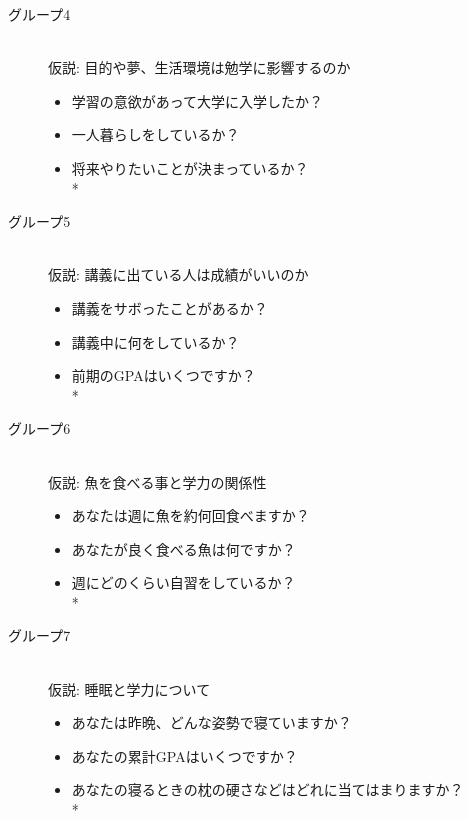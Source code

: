\begin{description}
 \item[グループ4]\mbox{}\\
 仮説: 目的や夢、生活環境は勉学に影響するのか
	    \begin{itemize}
   	\item 学習の意欲があって大学に入学したか？
   	\item 一人暮らしをしているか？
   	\item 将来やりたいことが決まっているか？   \vspace{0.1in} \\*
	\end{itemize}

 \item[グループ5]\mbox{}\\
 仮説: 講義に出ている人は成績がいいのか
	    \begin{itemize}
   	\item 講義をサボったことがあるか？
   	\item 講義中に何をしているか？
   	\item 前期のGPAはいくつですか？   \vspace{0.1in} \\*
	\end{itemize}

 \item[グループ6]\mbox{}\\
 仮説: 魚を食べる事と学力の関係性
	    \begin{itemize}
   	\item あなたは週に魚を約何回食べますか？
   	\item あなたが良く食べる魚は何ですか？
   	\item 週にどのくらい自習をしているか？   \vspace{0.1in} \\*
	\end{itemize}

 \item[グループ7]\mbox{}\\
 仮説: 睡眠と学力について
	    \begin{itemize}
   	\item あなたは昨晩、どんな姿勢で寝ていますか？
   	\item あなたの累計GPAはいくつですか？
   	\item あなたの寝るときの枕の硬さなどはどれに当てはまりますか？   \vspace{0.1in} \\*
	\end{itemize}


\end{description}
